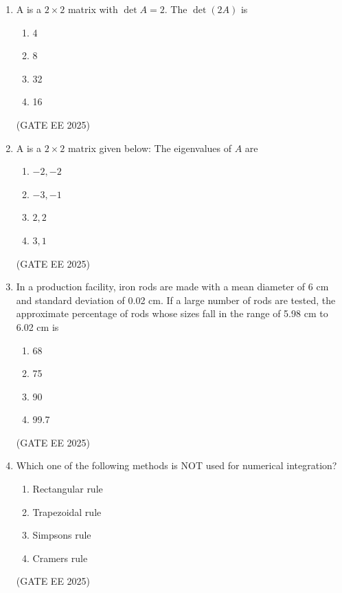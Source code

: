 \documentclass[11pt, letterpaper]{article}
\theoremstyle{remark}
\begin{document}
\begin{enumerate}

\item A is a $2 \times 2$ matrix with $\det A = 2$. The $\det (2A)$ is
\begin{multicols}{4}
\begin{enumerate}  
\item 4
\item 8
\item 32
\item 16
\end{enumerate}
\end{multicols}
\hfill(GATE EE 2025)



\item A is a $2 \times 2$ matrix given below:
The eigenvalues of $A$ are 
\begin{multicols}{4}
\begin{enumerate}  
\item $-2, -2$
\item $-3, -1$
\item $2, 2$
\item $3, 1$
\end{enumerate}
\end{multicols}
\hfill(GATE EE 2025)


\item In a production facility, iron rods are made with a mean diameter of 6 cm and standard deviation of 0.02 cm. If a large number of rods are tested, the approximate percentage of rods whose sizes fall in the range of 5.98 cm to 6.02 cm is
\begin{multicols}{4}
\begin{enumerate}  
\item 68
\item 75
\item 90
\item 99.7
\end{enumerate}
\end{multicols}
\hfill(GATE EE 2025)


\item Which one of the following methods is NOT used for numerical integration? 
\begin{multicols}{4}
\begin{enumerate}  
\item Rectangular rule
\item Trapezoidal rule
\item Simpson\textquotesingle s rule
\item Cramer\textquotesingle s rule
\end{enumerate}
\end{multicols}
\hfill(GATE EE 2025)
 


\end{enumerate}
\end{document}
